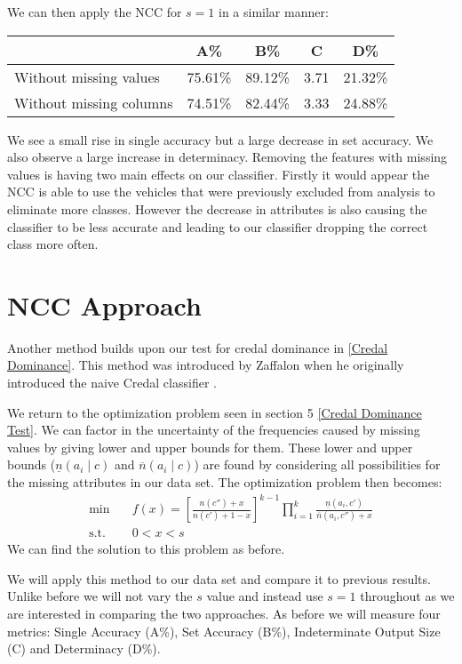 We can then apply the NCC for $s=1$ in a similar manner:
\begin{center}
\begin{tabular}{l|c c c c}
	                        &   A\%   &   B\%   &  C   &   D\%   \\
	\hline
	Without missing values  & 75.61\% & 89.12\% & 3.71 & 21.32\% \\
	Without missing columns & 74.51\% & 82.44\% & 3.33 & 24.88\% \\
\end{tabular}
\end{center}

We see a small rise in single accuracy but a large decrease in set accuracy.
We also observe a large increase in determinacy.
Removing the features with missing values is having two main effects on our classifier.
Firstly it would appear the NCC is able to use the vehicles that were previously excluded from analysis to eliminate more classes.
However the decrease in attributes is also causing the classifier to be less accurate and leading to our classifier dropping the correct class more often.

\section{NCC Approach}

Another method builds upon our test for credal dominance in \cref{Credal Dominance}.
This method was introduced by Zaffalon when he originally introduced the naive Credal classifier \cite{Zaffalon01}.

We return to the optimization problem seen in section 5 \cref{Credal Dominance Test}.
We can factor in the uncertainty of the frequencies caused by missing values by giving lower and upper bounds for them.
These lower and upper bounds ($\underline{n}(a_i \mid c)$ and $\overline{n}(a_i \mid c)$) are found by considering all possibilities for the missing attributes in our data set.
The optimization problem then becomes:
\begin{align}
	\min \quad & f(x) = \left[ \frac{n(c'') + x}{n(c') + 1 - x} \right]^{k-1} \prod_{i=1}^k \frac{\underline{n}(a_i, c')}{\overline{n}(a_i, c'') + x} \\
	\text{s.t.} \quad & 0 < x < s
\end{align}
We can find the solution to this problem as before.

We will apply this method to our data set and compare it to previous results.
Unlike before we will not vary the $s$ value and instead use $s=1$ throughout as we are interested in comparing the two approaches.
As before we will measure four metrics: Single Accuracy (A\%), Set Accuracy (B\%), Indeterminate Output Size (C) and Determinacy (D\%).

